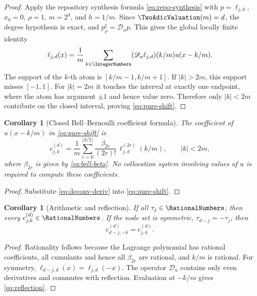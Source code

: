 \documentclass[11pt,oneside]{article}
\numberwithin{equation}{section}
\newtheorem{corollary}[theorem]{Corollary}
\theoremstyle{definition}
\theoremstyle{remark}
\newcommand{\calD}{\mathscr D_u}
\begin{document}
\begin{proof}
Apply the repository synthesis formula \eqref{eq:repo-synthesis} with
\(p=\ell_{j,d}\), \(x_0=0\), \(\rho=1\), \(m=2^d\), and
\(h=1/m\).  Since \(\TwoAdicValuation(m)=d\), the degree hypothesis is exact, and
\(p_\rho^\sharp=\calD p\).  This gives the global locally finite identity
\[
 \ell_{j,d}(x)=\frac1m\sum_{k\in\IntegerNumbers}
 (\calD\ell_{j,d})(k/m)u(x-k/m).
\]
The support of the \(k\)-th atom is
\([k/m-1,k/m+1]\).  If \(|k|>2m\), this support misses \([-1,1]\).
For \(|k|=2m\) it touches the interval at exactly one endpoint, where the atom
has argument \(\pm1\) and hence value zero.  Therefore only \(|k|<2m\)
contribute on the closed interval, proving \eqref{eq:pure-shift}.
\end{proof}

\begin{corollary}[Closed Bell--Bernoulli coefficient formula]
\label{cor:coeff}
The coefficient of \(u(x-k/m)\) in \eqref{eq:pure-shift} is
\begin{equation}
 c_{j,k}^{(d)}
 =\frac1m\sum_{r=0}^{\lfloor d/2\rfloor}
 \frac{\beta_{2r}}{(2r)!}\,
 \ell_{j,d}^{(2r)}(k/m),
 \qquad |k|<2m,
 \label{eq:cjk}
\end{equation}
where \(\beta_{2r}\) is given by \eqref{eq:bell-beta}.  No collocation
system involving values of \(u\) is required to compute these coefficients.
\end{corollary}

\begin{proof}
Substitute \eqref{eq:deconv-deriv} into \eqref{eq:pure-shift}.
\end{proof}

\begin{corollary}[Arithmetic and reflection]
\label{cor:arith-reflect}
If all \(\tau_j\in\RationalNumbers\), then every \(c_{j,k}^{(d)}\in\RationalNumbers\).  If the node set is
symmetric, \(\tau_{d-j}=-\tau_j\), then
\begin{equation}
 c_{d-j,-k}^{(d)}=c_{j,k}^{(d)}.
 \label{eq:reflection}
\end{equation}
\end{corollary}

\begin{proof}
Rationality follows because the Lagrange polynomial has rational coefficients,
all cumulants and hence all \(\beta_{2r}\) are rational, and \(k/m\) is rational.
For symmetry, \(\ell_{d-j,d}(x)=\ell_{j,d}(-x)\).  The operator \(\calD\)
contains only even derivatives and commutes with reflection.  Evaluation at
\(-k/m\) gives \eqref{eq:reflection}.
\end{proof}
\end{document}

